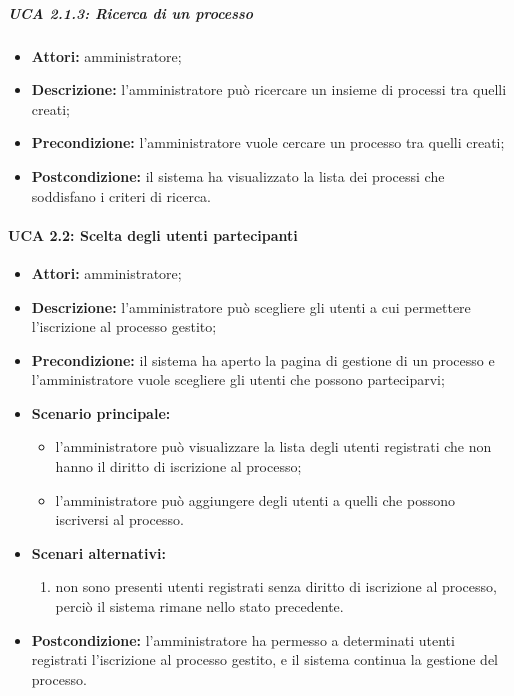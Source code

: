 \subparagraph{UCA 2.1.3: Ricerca di un processo}
\begin{itemize}
\item \textbf{Attori:} amministratore;
\item \textbf{Descrizione:} l'amministratore può ricercare un insieme di processi tra quelli creati;
\item \textbf{Precondizione:} l'amministratore vuole cercare un processo tra quelli creati;
\item \textbf{Postcondizione:} il sistema ha visualizzato la lista dei processi che soddisfano i criteri di ricerca.
\end{itemize}

\paragraph{UCA 2.2: Scelta degli utenti partecipanti}
\begin{itemize}
\item \textbf{Attori:} 
amministratore;
\item \textbf{Descrizione:} 
l'amministratore può scegliere gli utenti a cui permettere l'iscrizione al processo gestito;
\item \textbf{Precondizione:} 
il sistema ha aperto la pagina di gestione di un processo e l'amministratore vuole scegliere gli utenti che possono parteciparvi;
\item \textbf{Scenario principale:} 
\begin{itemize}
\item l'amministratore può visualizzare la lista degli utenti registrati che non hanno il diritto di iscrizione al processo;
\item l'amministratore può aggiungere degli utenti a quelli che possono iscriversi al processo.
\end{itemize}
\item \textbf{Scenari alternativi:}
\begin{enumerate}
\item non sono presenti utenti registrati senza diritto di iscrizione al processo, perciò il sistema rimane nello stato precedente.
\end{enumerate}
\item \textbf{Postcondizione:} 
l'amministratore ha permesso a determinati utenti registrati l'iscrizione al processo gestito, e il sistema continua la gestione del processo.
\end{itemize}

